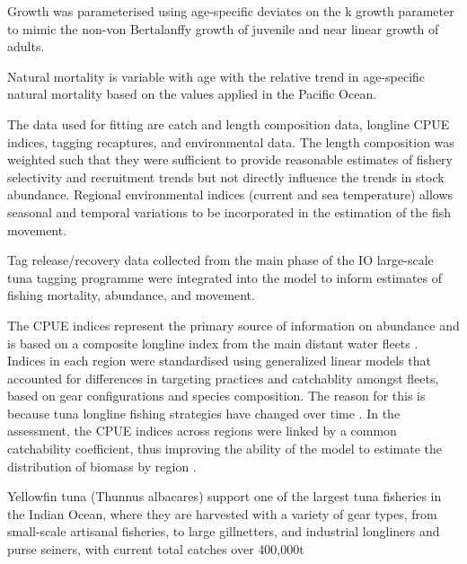 {Growth was parameterised using age-specific deviates on the k growth parameter to mimic the non-von Bertalanffy growth of juvenile and near linear growth of adults. 

Natural mortality is variable with age with the relative trend in age-specific natural mortality based on the values applied in the Pacific Ocean. 

The data used for fitting are catch and length composition data, longline CPUE indices, tagging recaptures, and environmental data. The length composition was weighted such that they were sufficient to provide reasonable estimates of fishery selectivity and recruitment trends but not directly influence the trends in stock abundance. Regional environmental indices (current and sea temperature) allows seasonal and temporal variations to be incorporated in the estimation of the fish movement. 

Tag release/recovery data collected from the main phase of the IO large-scale tuna tagging programme were integrated into the model to inform estimates of fishing mortality, abundance, and movement. 

The CPUE indices represent the primary source of information on abundance and is based on a composite longline index from the main distant water fleets \citep{Hoyle2018a}.
Indices in each region were standardised using generalized linear models that accounted for differences in targeting practices and catchablity amongst fleets, based on gear configurations and species composition. The reason for this is because tuna longline fishing strategies have changed over time \citep{Hampton2005}. In the assessment, the CPUE indices across regions were linked by a common catchability coefficient, thus improving the ability of the model to estimate the distribution of biomass by region \citep{Langley2015, Fu2018}. 


\iffalse

Yellowfin tuna (Thunnus albacares) support one of the largest tuna fisheries in the Indian Ocean, where they are harvested with a variety of gear types, from small-scale artisanal fisheries, to large gillnetters, and industrial longliners and purse seiners, with current total catches over 400,000t \cite{fiorellato2019tt}

}
